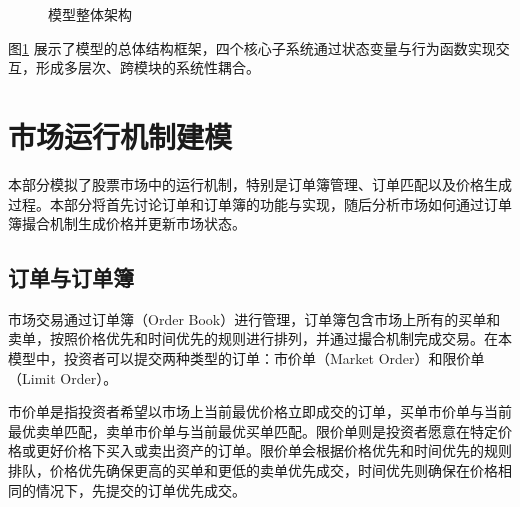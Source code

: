 \begin{figure}[h]
    \centering
    \caption{模型整体架构}
    \label{fig:architecture}
\end{figure}

图\ref{fig:architecture} 展示了模型的总体结构框架，四个核心子系统通过状态变量与行为函数实现交互，形成多层次、跨模块的系统性耦合。








\section{市场运行机制建模}

本部分模拟了股票市场中的运行机制，特别是订单簿管理、订单匹配以及价格生成过程。本部分将首先讨论订单和订单簿的功能与实现，随后分析市场如何通过订单簿撮合机制生成价格并更新市场状态。

\subsection{订单与订单簿}


市场交易通过订单簿（Order Book）进行管理，订单簿包含市场上所有的买单和卖单，按照价格优先和时间优先的规则进行排列，并通过撮合机制完成交易。在本模型中，投资者可以提交两种类型的订单：市价单（Market Order）和限价单（Limit Order）。

市价单是指投资者希望以市场上当前最优价格立即成交的订单，买单市价单与当前最优卖单匹配，卖单市价单与当前最优买单匹配。限价单则是投资者愿意在特定价格或更好价格下买入或卖出资产的订单。限价单会根据价格优先和时间优先的规则排队，价格优先确保更高的买单和更低的卖单优先成交，时间优先则确保在价格相同的情况下，先提交的订单优先成交。

